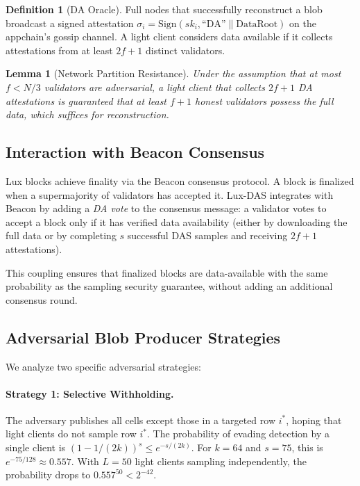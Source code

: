 \documentclass[11pt,a4paper]{article}
\theoremstyle{plain}
\newtheorem{lemma}{Lemma}[section]
\theoremstyle{definition}
\newtheorem{definition}{Definition}[section]
\theoremstyle{remark}
\begin{document}
\begin{definition}[DA Oracle]
Full nodes that successfully reconstruct a blob broadcast a signed attestation
$\sigma_i = \text{Sign}(sk_i, \text{``DA''} \| \text{DataRoot})$ on the appchain's gossip
channel. A light client considers data available if it collects attestations from at least
$2f+1$ distinct validators.
\end{definition}

\begin{lemma}[Network Partition Resistance]
\label{lemma:partition}
Under the assumption that at most $f < N/3$ validators are adversarial, a light client
that collects $2f+1$ DA attestations is guaranteed that at least $f+1$ honest validators
possess the full data, which suffices for reconstruction.
\end{lemma}

\subsection{Interaction with Beacon Consensus}

Lux blocks achieve finality via the Beacon consensus protocol. A block is finalized
when a supermajority of validators has accepted it. Lux-DAS integrates with Beacon by
adding a \emph{DA vote} to the consensus message: a validator votes to accept a block only
if it has verified data availability (either by downloading the full data or by completing
$s$ successful DAS samples and receiving $2f+1$ attestations).

This coupling ensures that finalized blocks are data-available with the same probability
as the sampling security guarantee, without adding an additional consensus round.

\subsection{Adversarial Blob Producer Strategies}

We analyze two specific adversarial strategies:

\paragraph{Strategy 1: Selective Withholding.}
The adversary publishes all cells except those in a targeted row $i^*$, hoping that light
clients do not sample row $i^*$. The probability of evading detection by a single client is
$(1 - 1/(2k))^s \leq e^{-s/(2k)}$. For $k = 64$ and $s = 75$, this is $e^{-75/128} \approx 0.557$.
With $L = 50$ light clients sampling independently, the probability drops to $0.557^{50} < 2^{-42}$.
\end{document}
